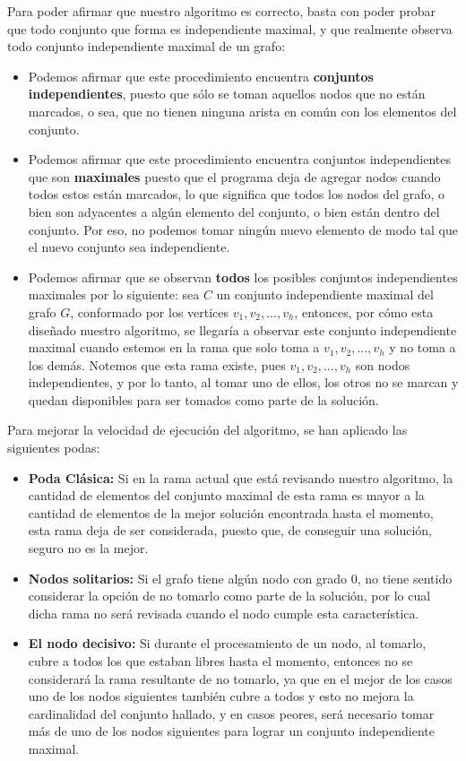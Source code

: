 Para poder afirmar que nuestro algoritmo es correcto, basta con poder probar que todo conjunto que forma es independiente maximal, y que realmente observa todo conjunto independiente maximal de un grafo:

\begin{itemize}
	\item Podemos afirmar que este procedimiento encuentra {\bf conjuntos independientes}, puesto que sólo se toman aquellos nodos que no están marcados, o sea, que no tienen ninguna arista en común con los elementos del conjunto.
	\item Podemos afirmar que este procedimiento encuentra conjuntos independientes que son {\bf maximales} puesto que el programa deja de agregar nodos cuando todos estos están marcados, lo que significa que todos los nodos del grafo, o bien son adyacentes a algún elemento del conjunto, o bien están dentro del conjunto. Por eso, no podemos tomar ningún nuevo elemento de modo tal que el nuevo conjunto sea independiente.
	\item Podemos afirmar que se observan {\bf todos} los posibles conjuntos independientes maximales por lo siguiente:  sea $C$ un conjunto independiente maximal del grafo $G$, conformado por los vertices $v_{1}, v_{2}, ... , v_{h}$, entonces, por cómo esta diseñado nuestro algoritmo, se llegaría a observar este conjunto independiente maximal cuando estemos en la rama que solo toma a $v_{1}, v_{2}, ... , v_{h}$ y no toma a los demás. Notemos que esta rama existe, pues $v_{1}, v_{2}, ... , v_{h}$ son nodos independientes, y por lo tanto, al tomar uno de ellos, los otros no se marcan y quedan disponibles para ser tomados como parte de la solución.
\end{itemize}

Para mejorar la velocidad de ejecución del algoritmo, se han aplicado las siguientes podas:

\begin{itemize}
	\item {\bf Poda Clásica:} Si en la rama actual que está revisando nuestro algoritmo, la cantidad de elementos del conjunto maximal de esta rama es mayor a la cantidad de elementos de la mejor solución encontrada hasta el momento, esta rama deja de ser considerada, puesto que, de conseguir una solución, seguro no es la mejor.
	\item {\bf Nodos solitarios:} Si el grafo tiene algún nodo con grado 0, no tiene sentido considerar la opción de no tomarlo como parte de la solución, por lo cual dicha rama no será revisada cuando el nodo cumple esta característica.
	\item {\bf El nodo decisivo:} Si durante el procesamiento de un nodo, al tomarlo, cubre a todos los que estaban libres hasta el momento, entonces no se considerará la rama resultante de no tomarlo, ya que en el mejor de los casos uno de los nodos siguientes también cubre a todos y esto no mejora la cardinalidad del conjunto hallado, y en casos peores, será necesario tomar más de uno de los nodos siguientes para lograr un conjunto independiente maximal.
\end{itemize}

